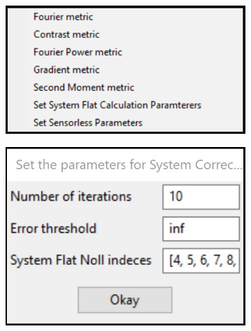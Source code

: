\begin{figure}[H]
	\begin{subfigure}{0.4\textwidth}
		\centering
		\includegraphics[width=\linewidth]{images/DM_methods_cockpit_options.png}
		\caption{}
		\label{fig:DM_methods_cockpit_options}
	\end{subfigure}
	\begin{subfigure}{0.29\textwidth}
		\centering
		\includegraphics[width=\linewidth]{images/direct_wavefront_sensing_options.jpg}
		\caption{}
		\label{fig:DM_direct_wavefront_sensing_options}
	\end{subfigure}
	\begin{subfigure}{0.23\textwidth}
		\centering

\end{subfigure}
\end{figure}
